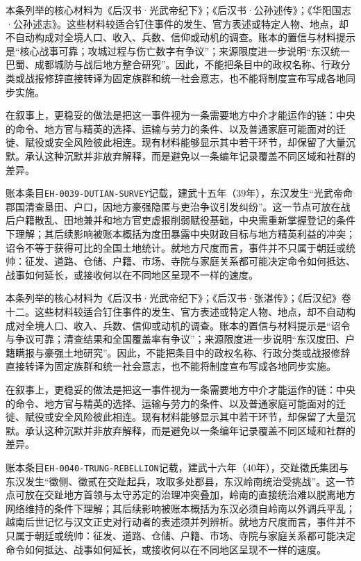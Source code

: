 本条列举的核心材料为《后汉书·光武帝纪下》；《后汉书·公孙述传》；《华阳国志·公孙述志》。这些材料较适合钉住事件的发生、官方表述或特定人物、地点，却不自动构成对全境人口、收入、兵数、信仰或动机的调查。账本的置信与材料提示是“核心战事可靠；攻城过程与伤亡数字有争议”；来源限度进一步说明“东汉统一巴蜀、成都城防与战后地方整合研究”。因此，不能把条目中的政权名称、行政分类或战报修辞直接转译为固定族群和统一社会意志，也不能将制度宣布写成各地同步实施。

在叙事上，更稳妥的做法是把这一事件视为一条需要地方中介才能运作的链：中央的命令、地方官与精英的选择、运输与劳力的条件、以及普通家庭可能面对的迁徙、赋役或安全风险彼此相连。现有材料能够显示其中若干环节，却保留了大量沉默。承认这种沉默并非放弃解释，而是避免以一条编年记录覆盖不同区域和社群的差异。

账本条目\texttt{EH-0039-DUTIAN-SURVEY}记载，建武十五年（39年），东汉发生“光武帝命郡国清查垦田、户口，因地方豪强隐匿与吏治争议引发纠纷”。这一节点可放在战后户籍散乱、田地兼并和地方官吏虚报削弱赋役基础，中央需重新掌握登记的条件下理解；其后续影响被账本概括为度田暴露中央财政目标与地方精英利益的冲突；诏令不等于获得可比的全国土地统计。就地方尺度而言，事件并不只属于朝廷或统帅：征发、道路、仓储、户籍、市场、寺院与家庭关系都可能决定命令如何抵达、战事如何延长，或接收何以在不同地区呈现不一样的速度。

本条列举的核心材料为《后汉书·光武帝纪下》；《后汉书·张湛传》；《后汉纪》卷十二。这些材料较适合钉住事件的发生、官方表述或特定人物、地点，却不自动构成对全境人口、收入、兵数、信仰或动机的调查。账本的置信与材料提示是“诏令与争议可靠；清查结果和全国覆盖率有争议”；来源限度进一步说明“东汉度田、户籍瞒报与豪强土地研究”。因此，不能把条目中的政权名称、行政分类或战报修辞直接转译为固定族群和统一社会意志，也不能将制度宣布写成各地同步实施。

在叙事上，更稳妥的做法是把这一事件视为一条需要地方中介才能运作的链：中央的命令、地方官与精英的选择、运输与劳力的条件、以及普通家庭可能面对的迁徙、赋役或安全风险彼此相连。现有材料能够显示其中若干环节，却保留了大量沉默。承认这种沉默并非放弃解释，而是避免以一条编年记录覆盖不同区域和社群的差异。

账本条目\texttt{EH-0040-TRUNG-REBELLION}记载，建武十六年（40年），交趾徵氏集团与东汉发生“徵侧、徵贰在交趾起兵，攻取多处郡县，东汉岭南统治受挑战”。这一节点可放在交趾地方首领与太守苏定的治理冲突叠加，岭南的直接统治难以脱离地方网络维持的条件下理解；其后续影响被账本概括为东汉必须自岭南以外调兵平乱；越南后世记忆与汉文正史对行动者的表述须并列辨析。就地方尺度而言，事件并不只属于朝廷或统帅：征发、道路、仓储、户籍、市场、寺院与家庭关系都可能决定命令如何抵达、战事如何延长，或接收何以在不同地区呈现不一样的速度。

